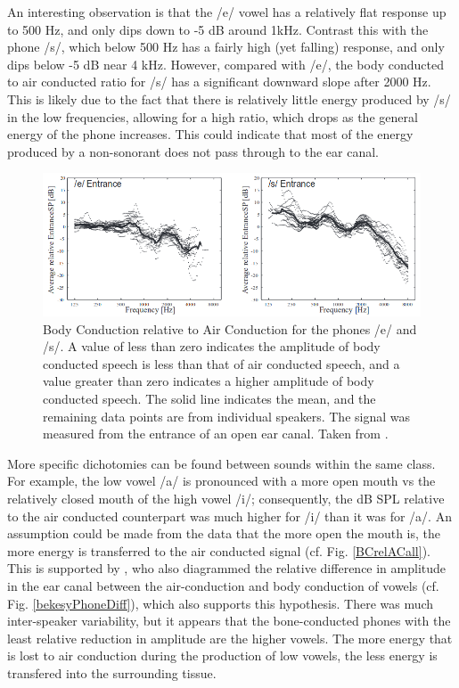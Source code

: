 \documentclass[dissertation,copyright]{uathesis}
\begin{document}
An interesting observation is that the /e/ vowel has a relatively flat response up to 500 Hz, and only dips down to -5 dB around 1kHz.  Contrast this with the phone /s/, which below 500 Hz has a fairly high (yet falling) response, and only dips below -5 dB near 4 kHz.  However, compared with /e/, the body conducted to air conducted ratio for /s/ has a significant downward slope after 2000 Hz.  This is likely due to the fact that there is relatively little energy produced by /s/ in the low frequencies, allowing for a high ratio, which drops as the general energy of the phone increases.  This could indicate that most of the energy produced by a non-sonorant does not pass through to the ear canal.

\begin{figure}
\includegraphics[width=1\textwidth]{figure/BCrelAC_e_s.png}
\caption{Body Conduction relative to Air Conduction for the phones /e/ and /s/.  A value of less than zero indicates the amplitude of body conducted speech is less than that of air conducted speech, and a value greater than zero indicates a higher amplitude of body conducted speech. The solid line indicates the mean, and the remaining data points are from individual speakers.  The signal was measured from the entrance of an open ear canal.  Taken from \cite{reinfeldt:10}.}
\label{BCrelAC}
\end{figure}

More specific dichotomies can be found between sounds within the same class. For example, the low vowel /a/ is pronounced with a more open mouth vs the relatively closed mouth of the high vowel /i/; consequently, the dB SPL relative to the air conducted counterpart was much higher for /i/ than it was for /a/. An assumption could be made from the data that the more open the mouth is, the more energy is transferred to the air conducted signal (cf. Fig. \ref{BCrelACall}).  This is supported by \cite{bekesy:60}, who also diagrammed the relative difference in amplitude in the ear canal between the air-conduction and body conduction of vowels (cf. Fig. \ref{bekesyPhoneDiff}), which also supports this hypothesis.  There was much inter-speaker variability, but it appears that the bone-conducted phones with the least relative reduction in amplitude are the higher vowels.  The more energy that is lost to air conduction during the production of low vowels, the less energy is transfered into the surrounding tissue.
\end{document}
